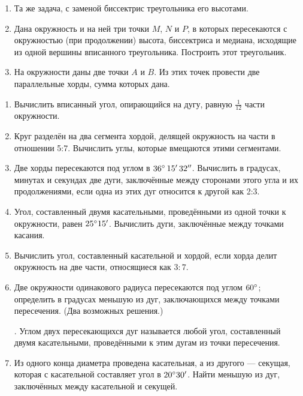 \documentclass[oneside]{book}
\begin{document}
\begin{enumerate}[resume]
 \item
Та же задача, с заменой биссектрис треугольника его высотами.

 \item
Дана окружность и на ней три точки $M$, $N$ и $P$, в которых пересекаются с окружностью (при продолжении) высота, биссектриса и медиана, исходящие из одной вершины вписанного треугольника.
Построить этот треугольник.

 \item
На окружности даны две точки $A$ и $B$.
Из этих точек провести две параллельные хорды, сумма которых дана.

\end{enumerate}

\begin{center}
\end{center}

\begin{enumerate}[resume]

 \item
Вычислить вписанный угол, опирающийся на дугу, равную $\tfrac1{12}$ части окружности.

 \item
Круг разделён на два сегмента хордой, делящей окружность на части в отношении 5:7.
Вычислить углы, которые вмещаются этими сегментами.

 \item
Две хорды пересекаются под углом в $36\degree\, 15'\, 32''$.
Вычислить в градусах, минутах и секундах две дуги, заключённые между сторонами этого угла и их продолжениями, если одна из этих дуг относится к другой как 2:3.

 \item
Угол, составленный двумя касательными, проведёнными из одной точки к окружности, равен $25\degree15'$.
Вычислить дуги, заключённые между точками касания.

 \item
Вычислить угол, составленный касательной и хордой, если хорда делит окружность на две части, относящиеся как $3:7$.

 \item
Две окружности одинакового радиуса пересекаются под углом $60\degree$;
определить в градусах меньшую из дуг, заключающихся между точками пересечения. (Два возможных решения.)

\smallskip
{}.
Углом двух пересекающихся дуг называется любой угол, составленный двумя касательными, проведёнными к этим дугам из точки пересечения.

 \item
Из одного конца диаметра проведена касательная, а из другого — секущая, которая с касательной составляет угол в $20\degree 30'$.
Найти меньшую из дуг, заключённых между касательной и секущей.

\end{enumerate}
\end{document}
